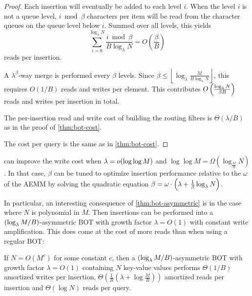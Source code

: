 \asymbot*

\begin{proof}
	Each insertion will eventually be added to each level $i$. When the level
	$i$ is not a queue level, $i\bmod \beta$ characters per item will be read from
	the character queues on the queue level below $i$. Summed over all levels, this
	yields
	\[\sum_{i=0}^{\log_\lambda N} \frac{i\bmod \beta}{B\log_\lambda N} = O\left(\frac{\beta}{B}\right)\]
	reads per insertion.

	A $\lambda^\beta$-way merge is performed every $\beta$ levels. Since $\beta
	\leq \left\lfloor\log_\lambda\frac{M}{B\log_\lambda N}\right\rfloor$, this
	requires $O(1/B)$ reads and writes per element. This contributes
	$O\left(\frac{\log_\lambda{N}}{\beta B}\right)$ reads and writes per
	insertion in total.

	The per-insertion read and write cost of building the routing filters is
	$\Theta(\lambda/B)$ as in the proof of \cref{thm:bot-cost}.

	The cost per query is the same as in \cref{thm:bot-cost}.
\end{proof}

 can improve the write cost when $\lambda =
o(\log\log M)$ and $\log\log M = \Omega\left(\log_{\frac{M}{B}}{N}\right)$. In
that case, $\beta$ can be tuned to optimize insertion performance relative to
the $\omega$ of the AEMM by solving the quadratic equation $\beta = \omega
\cdot \left(\lambda + \frac{1}{\beta}\log_{\lambda}{N} \right)$. 

In particular, an interesting consequence of \cref{thm:bot-asymmetric} is
in the case where $N$ is polynomial in $M$. Then insertions can be performed
into a $(\log_\lambda{M/B})$-asymmetric BOT with growth factor $\lambda = O(1)$
with constant write amplification. This does come at the cost of more reads
than when using a regular BOT:

\begin{corollary}
        If $N = O(M^c)$ for some constant $c$, then a
        $(\log_\lambda{M/B})$-asymmetric BOT with growth factor $\lambda=O(1)$
        containing $N$ key-value values performs $\Theta(1/B)$ amortized writes
        per insertion, $\Theta\left(\frac{1}{B}\left(\lambda +
        \log{\frac{M}{B}}\right)\right)$ amortized reads per insertion and
        $\Theta(\log N)$ reads per query.
\end{corollary}

